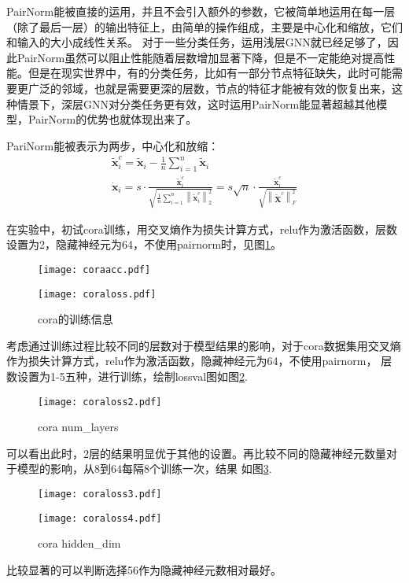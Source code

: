 \documentclass[a4paper,AutoFakeBold,AutoFakeSlant]{ctexart}
\begin{document}
PairNorm能被直接的运用，并且不会引入额外的参数，它被简单地运用在每一层（除了最后一层）的输出特征上，由简单的操作组成，主要是中心化和缩放，它们和输入的大小成线性关系。
对于一些分类任务，运用浅层GNN就已经足够了，因此PairNorm虽然可以阻止性能随着层数增加显著下降，但是不一定能绝对提高性能。但是在现实世界中，有的分类任务，比如有一部分节点特征缺失，此时可能需要更广泛的邻域，也就是需要更深的层数，节点的特征才能被有效的恢复出来，这种情景下，深层GNN对分类任务更有效，这时运用PairNorm能显著超越其他模型，PairNorm的优势也就体现出来了。

PariNorm能被表示为两步，中心化和放缩：
\begin{equation}
  \begin{array}{l}
    \tilde{\mathbf{x}}_{i}^{c}=\tilde{\mathbf{x}}_{i}-\frac{1}{n} \sum_{i=1}^{n} \tilde{\mathbf{x}}_{i} \\
    \dot{\mathbf{x}}_{i}=s \cdot \frac{\tilde{\mathbf{x}}_{i}^{c}}{\sqrt{\frac{1}{n} \sum_{i=1}^{n}\left\|\tilde{\mathbf{x}}_{i}^{c}\right\|_{2}^{2}}}=s \sqrt{n} \cdot \frac{\tilde{\mathbf{x}}_{i}^{c}}{\sqrt{\left\|\tilde{\mathbf{X}}^{c}\right\|_{F}^{2}}}
    \end{array}
\end{equation}

在实验中，初试cora训练，用交叉熵作为损失计算方式，relu作为激活函数，层数设置为2，隐藏神经元为64，不使用pairnorm时，见图\ref{f3}。
\begin{figure}[htbp]
  \centering
  \begin{minipage}[t]{0.48\textwidth}
  \centering
  \texttt{[image: coraacc.pdf]}
  \end{minipage}
  \begin{minipage}[t]{0.48\textwidth}
  \centering
  \texttt{[image: coraloss.pdf]}
  \end{minipage}
  \caption{cora的训练信息}
  \label{f3}
\end{figure}

考虑通过训练过程比较不同的层数对于模型结果的影响，对于cora数据集用交叉熵作为损失计算方式，relu作为激活函数，隐藏神经元为64，不使用pairnorm，
层数设置为1-5五种，进行训练，绘制lossval图如图\ref{f4}.
\begin{figure}[htbp]
  \centering
  \texttt{[image: coraloss2.pdf]}
  \caption{cora num\_layers}
  \label{f4}
\end{figure}
可以看出此时，2层的结果明显优于其他的设置。再比较不同的隐藏神经元数量对于模型的影响，从8到64每隔8个训练一次，结果
如图\ref{f5}.
\begin{figure}[htbp]
  \centering
  \begin{minipage}[t]{0.48\textwidth}
  \centering
  \texttt{[image: coraloss3.pdf]}
  \end{minipage}
  \begin{minipage}[t]{0.48\textwidth}
  \centering
  \texttt{[image: coraloss4.pdf]}
  \end{minipage}
  \caption{cora hidden\_dim}
  \label{f5}
\end{figure}
比较显著的可以判断选择56作为隐藏神经元数相对最好。
\end{document}
